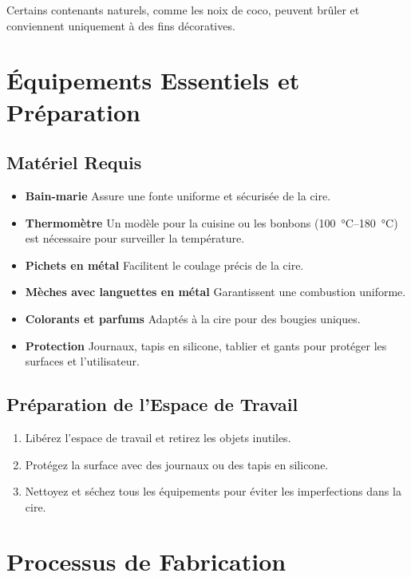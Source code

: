 \documentclass[11pt,fleqn,onecolumn,oneside]{book}
\begin{document}
\begin{remark}
Certains contenants naturels, comme les noix de coco, peuvent brûler et conviennent uniquement à des fins décoratives.
\end{remark}

\section{Équipements Essentiels et Préparation}

\subsection*{Matériel Requis}
\begin{itemize}
    \item \textbf{Bain-marie} Assure une fonte uniforme et sécurisée de la cire.
    \item \textbf{Thermomètre} Un modèle pour la cuisine ou les bonbons (\SIrange{100}{180}{\degreeCelsius}) est nécessaire pour surveiller la température.
    \item \textbf{Pichets en métal} Facilitent le coulage précis de la cire.
    \item \textbf{Mèches avec languettes en métal} Garantissent une combustion uniforme.
    \item \textbf{Colorants et parfums} Adaptés à la cire pour des bougies uniques.
    \item \textbf{Protection} Journaux, tapis en silicone, tablier et gants pour protéger les surfaces et l’utilisateur.
\end{itemize}

\subsection*{Préparation de l’Espace de Travail}
\begin{enumerate}
    \item Libérez l’espace de travail et retirez les objets inutiles.
    \item Protégez la surface avec des journaux ou des tapis en silicone.
    \item Nettoyez et séchez tous les équipements pour éviter les imperfections dans la cire.
\end{enumerate}

\section{Processus de Fabrication}
\end{document}
